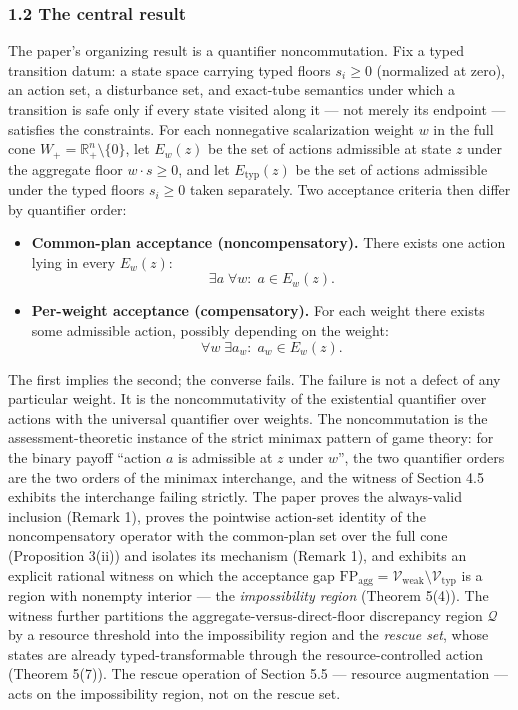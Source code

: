 \documentclass[11pt]{article}
\providecommand{\tightlist}{\setlength{\itemsep}{0pt}\setlength{\parskip}{0pt}}
\begin{document}
\subsubsection{1.2 The central result}\label{the-central-result}

The paper's organizing result is a quantifier noncommutation. Fix a
typed transition datum: a state space carrying typed floors
\(s_i \ge 0\) (normalized at zero), an action set, a disturbance set,
and exact-tube semantics under which a transition is safe only if every
state visited along it --- not merely its endpoint --- satisfies the
constraints. For each nonnegative scalarization weight \(w\) in the full
cone \(W_+ = \mathbb{R}^n_+ \setminus \{0\}\), let \(E_w(z)\) be the set
of actions admissible at state \(z\) under the aggregate floor
\(w \cdot s \ge 0\), and let \(E_{\mathrm{typ}}(z)\) be the set of
actions admissible under the typed floors \(s_i \ge 0\) taken
separately. Two acceptance criteria then differ by quantifier order:

\begin{itemize}
\tightlist
\item
  \textbf{Common-plan acceptance (noncompensatory).} There exists one
  action lying in every \(E_w(z)\):
  \[\exists a\; \forall w:\; a \in E_w(z).\]
\item
  \textbf{Per-weight acceptance (compensatory).} For each weight there
  exists some admissible action, possibly depending on the weight:
  \[\forall w\; \exists a_w:\; a_w \in E_w(z).\]
\end{itemize}

The first implies the second; the converse fails. The failure is not a
defect of any particular weight. It is the noncommutativity of the
existential quantifier over actions with the universal quantifier over
weights. The noncommutation is the assessment-theoretic instance of the
strict minimax pattern of game theory: for the binary payoff ``action
\(a\) is admissible at \(z\) under \(w\)'', the two quantifier orders
are the two orders of the minimax interchange, and the witness of
Section 4.5 exhibits the interchange failing strictly. The paper proves
the always-valid inclusion (Remark 1), proves the pointwise action-set
identity of the noncompensatory operator with the common-plan set over
the full cone (Proposition 3(ii)) and isolates its mechanism (Remark 1),
and exhibits an explicit rational witness on which the acceptance gap
\(\mathrm{FP}_{\mathrm{agg}} = \mathcal{V}_{\mathrm{weak}} \setminus \mathcal{V}_{\mathrm{typ}}\)
is a region with nonempty interior --- the \emph{impossibility region}
(Theorem 5(4)). The witness further partitions the
aggregate-versus-direct-floor discrepancy region \(\mathcal{Q}\) by a
resource threshold into the impossibility region and the \emph{rescue
set}, whose states are already typed-transformable through the
resource-controlled action (Theorem 5(7)). The rescue operation of
Section 5.5 --- resource augmentation --- acts on the impossibility
region, not on the rescue set.
\end{document}
